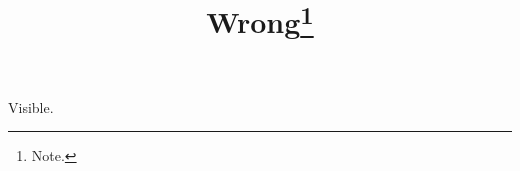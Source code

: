 \documentclass[paper=A4]{ropas-poster}
\title{Wrong\footnote{Note.}}
\begin{document}
Visible.
\end{document}
